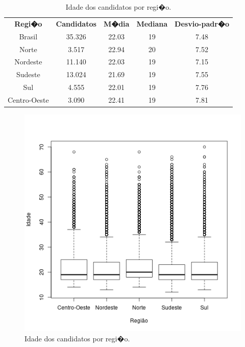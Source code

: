 \documentclass[12pt]{article}
\begin{document}
\begin{minipage}{.5\textwidth}
    \begin{table}[H]
    \begin{tabular}{ c c c c c }
      \textbf{Regi�o}  & \textbf{Candidatos} & \textbf{M�dia} & \textbf{Mediana} & \textbf{Desvio-padr�o} \\
      Brasil           & 35.326              & 22.03          & 19               & 7.48 \\
      Norte            & 3.517               & 22.94          & 20               & 7.52 \\
      Nordeste         & 11.140              & 22.03          & 19               & 7.15 \\
      Sudeste          & 13.024              & 21.69          & 19               & 7.55 \\
      Sul              & 4.555               & 22.01          & 19               & 7.76 \\
      Centro-Oeste     & 3.090               & 22.41          & 19               & 7.81 \\
    \end{tabular}
    \caption{Idade dos candidatos por regi�o.}
    \label{tab:idade-por-regiao}
    \end{table}
\end{minipage}%
\begin{minipage}{.5\textwidth}
    \begin{figure}[H]
    \includegraphics[width=\linewidth]{../regiao_idade.png}
    \caption{Idade dos candidatos por regi�o.}
    \label{fig:idade-por-regiao}
    \end{figure}
\end{minipage}
\end{document}
